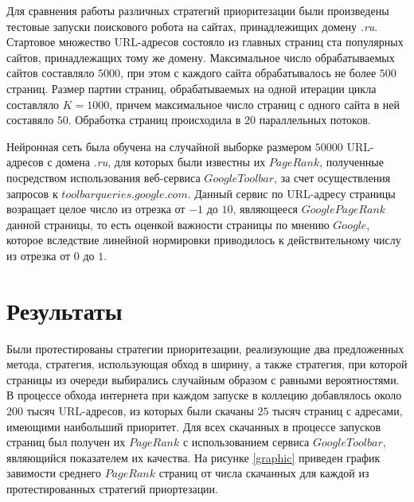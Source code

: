 Для сравнения работы различных стратегий приоритезации были произведены тестовые запуски поискового робота на сайтах, принадлежищих домену \textit{.ru}. Стартовое множество URL-адресов состояло из главных страниц ста популярных сайтов, принадлежащих тому же домену. 
Максимальное число обрабатываемых сайтов составляло $5000$, при этом с каждого сайта обрабатывалось не более $500$ страниц. Размер партии страниц, обрабатываемых на одной итерации цикла составляло $K = 1000$, причем максимальное число страниц с одного сайта в ней составяло $50$. Обработка страниц происходила в $20$ параллельных потоков.

Нейронная сеть была обучена на случайной выборке размером $50000$ URL-адресов с домена \textit{.ru}, для которых были известны их $PageRank$, полученные посредством использования веб-сервиса $Google Toolbar$, за счет осуществления запросов к $toolbarqueries.google.com$. Данный сервис по URL-адресу страницы возращает целое число из отрезка от $-1$ до $10$, являющееся $Google PageRank$ данной страницы, то есть оценкой важности страницы по мнению $Google$, которое вследствие линейной нормировки приводилось к действительному числу из отрезка от $0$ до $1$.

\section{Результаты}

Были протестированы стратегии приоритезации, реализующие два предложенных метода, стратегия, использующая обход в ширину, а также стратегия, при которой страницы из очереди выбирались случайным образом с равными вероятностями. В процессе обхода интернета при каждом запуске в коллецию добавлялось около $200$ тысяч URL-адресов, из которых были скачаны $25$ тысяч страниц с адресами, имеющими наибольший приоритет. Для всех скачанных в процессе запусков страниц был получен их $PageRank$ с использованием сервиса $Google Toolbar$, являющийся показателем их качества. На рисунке \ref{graphic} приведен график завимости среднего $PageRank$ страниц от числа скачанных для каждой из протестированных стратегий приортезации.

